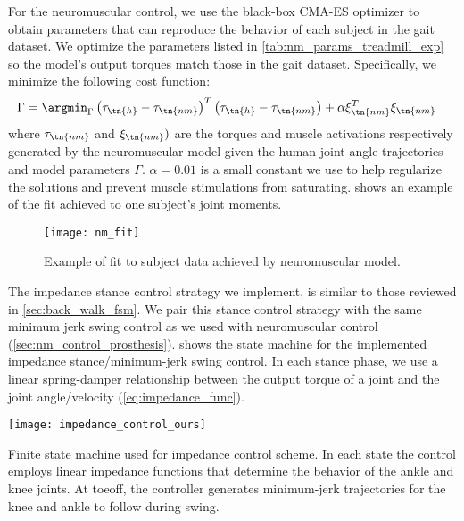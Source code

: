 For the neuromuscular control, we use the black-box CMA-ES optimizer
\citep{hansen2006cma} to obtain parameters that can reproduce the behavior of
each subject in the gait dataset. We optimize the parameters listed in
\cref{tab:nm_params_treadmill_exp} so the model's output torques match those in
the gait dataset. Specifically, we minimize the following cost function:
\begin{align}
    \Gamma &= \argmin_\Gamma \left(\tau_\tn{h} - \tau_\tn{nm} \right)^T
    \left(\tau_\tn{h} - \tau_\tn{nm} \right) + \alpha \xi_\tn{nm}^T \xi_\tn{nm}
\end{align}
where $\tau_\tn{nm}$ and  $\xi_\tn{nm})$ are the torques and muscle activations
respectively generated by the neuromuscular model given the human joint angle
trajectories and model parameters $\Gamma$. $\alpha = 0.01$ is a small constant
we use to help regularize the solutions and prevent muscle stimulations from
saturating.  shows an example of the fit achieved to
one subject's joint moments.
\begin{figure}[b]
    \centering 
    \texttt{[image: nm\_fit]}
    \caption{Example of fit to subject data achieved by neuromuscular
    model.}\label{fig:treadmill_nm_fit}
\end{figure}

The impedance stance control strategy we implement, is similar to those reviewed
in \cref{sec:back_walk_fsm}. We pair this stance control strategy with the same
minimum jerk swing control as we used with neuromuscular control
(\cref{sec:nm_control_prosthesis}).  shows the
state machine for the implemented impedance stance/minimum-jerk swing control.
In each stance phase, we use a linear spring-damper relationship between the
output torque of a joint and the joint angle/velocity
(\cref{eq:impedance_func}).
\begin{marginfigure}
    \centering
    \texttt{[image: impedance\_control\_ours]}
    \caption[Finite state machine used for impedance control scheme]{Finite
    state machine used for impedance control scheme. In each state the control
    employs linear impedance functions that determine the behavior of the ankle
    and knee joints. At toeoff, the controller generates minimum-jerk
    trajectories for the knee and ankle to follow during
    swing.}\label{fig:impedance_control_ours}
\end{marginfigure}

